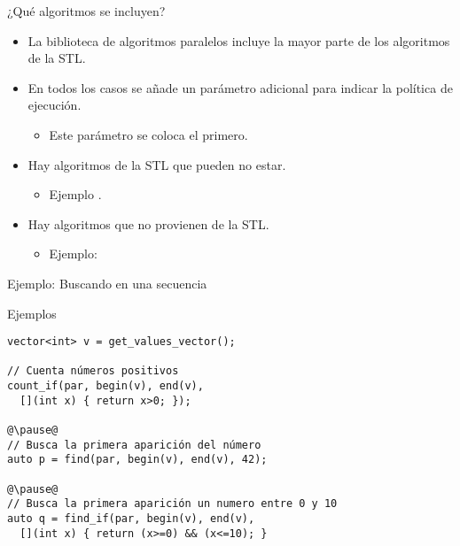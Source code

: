 \begin{frame}[t]{¿Qué algoritmos se incluyen?}
\begin{itemize}
  \item La biblioteca de algoritmos paralelos incluye la mayor parte
        de los algoritmos de la STL.
  \item En todos los casos se añade un parámetro adicional para indicar
        la política de ejecución.
    \begin{itemize}
      \item Este parámetro se coloca el primero.
    \end{itemize}
  \item Hay algoritmos de la STL que pueden no estar.
    \begin{itemize}
      \item Ejemplo .
    \end{itemize}
  \item Hay algoritmos que no provienen de la STL.
    \begin{itemize}
      \item Ejemplo: 
    \end{itemize}
\end{itemize}
\end{frame}

\begin{frame}[t,fragile]{Ejemplo: Buscando en una secuencia}
\begin{block}{Ejemplos}
\begin{lstlisting}[escapechar=@]
vector<int> v = get_values_vector();

// Cuenta números positivos
count_if(par, begin(v), end(v), 
  [](int x) { return x>0; });

@\pause@
// Busca la primera aparición del número
auto p = find(par, begin(v), end(v), 42);

@\pause@
// Busca la primera aparición un numero entre 0 y 10
auto q = find_if(par, begin(v), end(v),
  [](int x) { return (x>=0) && (x<=10); }
\end{lstlisting}
\end{block}
\end{frame}

